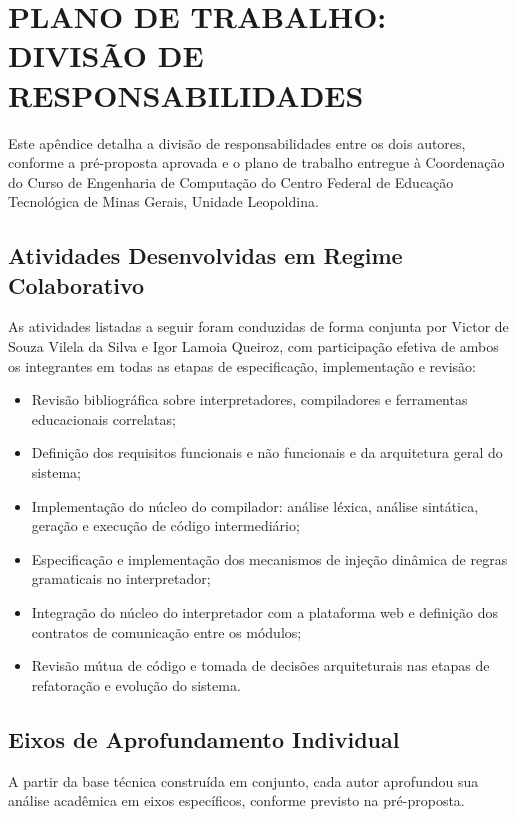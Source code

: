 
\chapter{PLANO DE TRABALHO: DIVISÃO DE RESPONSABILIDADES} \label{ap:plano}

Este apêndice detalha a divisão de responsabilidades entre os dois autores, conforme a pré-proposta aprovada e o plano de trabalho entregue à Coordenação do Curso de Engenharia de Computação do Centro Federal de Educação Tecnológica de Minas Gerais, Unidade Leopoldina.

\section{Atividades Desenvolvidas em Regime Colaborativo}

As atividades listadas a seguir foram conduzidas de forma conjunta por Victor de Souza Vilela da Silva e Igor Lamoia Queiroz, com participação efetiva de ambos os integrantes em todas as etapas de especificação, implementação e revisão:

\begin{itemize}
    \item Revisão bibliográfica sobre interpretadores, compiladores e ferramentas educacionais correlatas;
    \item Definição dos requisitos funcionais e não funcionais e da arquitetura geral do sistema;
    \item Implementação do núcleo do compilador: análise léxica, análise sintática, geração e execução de código intermediário;
    \item Especificação e implementação dos mecanismos de injeção dinâmica de regras gramaticais no interpretador;
    \item Integração do núcleo do interpretador com a plataforma web e definição dos contratos de comunicação entre os módulos;
    \item Revisão mútua de código e tomada de decisões arquiteturais nas etapas de refatoração e evolução do sistema.
\end{itemize}

\section{Eixos de Aprofundamento Individual}

A partir da base técnica construída em conjunto, cada autor aprofundou sua análise acadêmica em eixos específicos, conforme previsto na pré-proposta.

